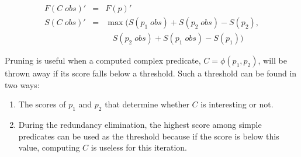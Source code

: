 \begin{eqnarray}
 \nonumber
  F(C\;obs)' &=& F(p)' \\
 \nonumber
  S(C\;obs)' &=&
  \max(S(p_1\;obs)+S(p_2\;obs)-S(p_2),\\
 \nonumber
  & &\ \ \ \ S(p_2\;obs)+S(p_1\;obs)-S(p_1))
\end{eqnarray}

Pruning is useful when a computed complex predicate, $C = \phi(p_1, p_2)$, will be thrown away if its score falls below a threshold.  Such a threshold can be found in two ways:
\begin{enumerate}
\item The scores of $p_1$ and $p_2$ that determine whether $C$ is interesting or not.
\item During the redundancy elimination, the highest %
score among simple predicates can be used as the threshold because if the score is below this value, computing $C$ is useless for this iteration.
\end{enumerate}
